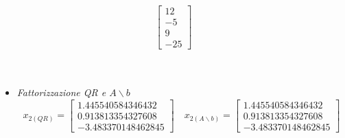 \begin{enumerate}
\[\begin{bmatrix}
	      	12  \\
	      	-5  \\
	      	9   \\
	      	-25
	      	\end{bmatrix}
	      \]\\\
	      \begin{itemize}
	      	\item \textit{Fattorizzazione QR e $A \backslash b$}
	      	      \[
	      	      	x_{2(QR)} =\begin{bmatrix}
	      	      	1.445540584346432  \\
	      	      	0.913813354327608 \\
	      	      	-3.483370148462845
	      	      	\end{bmatrix} \quad
	      	      	x_{2(A \backslash b)} =\begin{bmatrix}
	      	      	1.445540584346432  \\
	      	      	0.913813354327608  \\
	      	      	-3.483370148462845
	      	      	\end{bmatrix}
	      	      \]	
	      \end{itemize}
\end{enumerate}